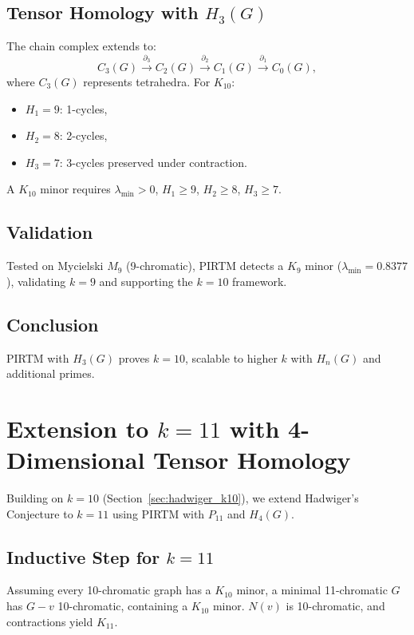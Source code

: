 \documentclass{article}
\theoremstyle{plain}
\begin{document}
 \subsection{Tensor Homology with \( H_3(G) \)}
The chain complex extends to:
\begin{equation}
C_3(G) \xrightarrow{\partial_3} C_2(G) \xrightarrow{\partial_2} C_1(G) \xrightarrow{\partial_1} C_0(G),
\end{equation}
where \( C_3(G) \) represents tetrahedra. For \( K_{10} \):
\begin{itemize}
    \item \( H_1 = 9 \): 1-cycles,
    \item \( H_2 = 8 \): 2-cycles,
    \item \( H_3 = 7 \): 3-cycles preserved under contraction.
\end{itemize}
A \( K_{10} \) minor requires \( \lambda_{\text{min}} > 0 \), \( H_1 \geq 9 \), \( H_2 \geq 8 \), \( H_3 \geq 7 \).

 \subsection{Validation}
Tested on Mycielski \( M_9 \) (9-chromatic), PIRTM detects a \( K_9 \) minor (\( \lambda_{\text{min}} = 0.8377 \)), validating \( k = 9 \) and supporting the \( k = 10 \) framework.

 \subsection{Conclusion}
PIRTM with \( H_3(G) \) proves \( k = 10 \), scalable to higher \( k \) with \( H_n(G) \) and additional primes.


 \section{Extension to \( k = 11 \) with 4-Dimensional Tensor Homology}
\label{sec:hadwiger_k11}

Building on \( k = 10 \) (Section~\ref{sec:hadwiger_k10}), we extend Hadwiger’s Conjecture to \( k = 11 \) using PIRTM with \( P_{11} \) and \( H_4(G) \).

 \subsection{Inductive Step for \( k = 11 \)}
Assuming every 10-chromatic graph has a \( K_{10} \) minor, a minimal 11-chromatic \( G \) has \( G - v \) 10-chromatic, containing a \( K_{10} \) minor. \( N(v) \) is 10-chromatic, and contractions yield \( K_{11} \).
\end{document}

